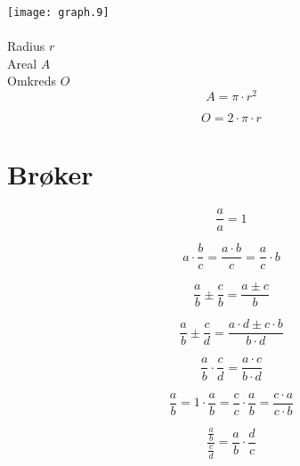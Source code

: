 \documentclass[11pt,a5paper,fleqn,leqno]{book}
\begin{document}
\texttt{[image: graph.9]}
\\
\\
Radius $r$ \\
Areal $A$ \\
Omkreds $O$
\begin{equation}
A = \pi \cdot r^2
\end{equation}

\begin{equation}
O = 2 \cdot \pi \cdot r
\end{equation}

\section{Brøker}

\begin{equation} \label{eq:taeller_naevner_det_samme}
\frac{a}{a} = 1
\end{equation}

\begin{equation} \label{eq:konstant_gange_med_broek}
a \cdot \frac{b}{c} = \frac{a \cdot b}{c} = \frac{a}{c} \cdot b
\end{equation}

\begin{equation} \label{eq:broeker_med_ens_naevnere_plusminus}
\frac{a}{b} \pm \frac{c}{b} = \frac{a \pm c}{b}
\end{equation}

\begin{equation} \label{eq:broeker_med_forskellige_naevnere_plusminus}
\frac{a}{b} \pm \frac{c}{d} = \frac{a \cdot d \pm c \cdot b}{b \cdot d}
\end{equation}

\begin{equation} \label{eq:broeker_ganget_sammen}
\frac{a}{b} \cdot \frac{c}{d} = \frac{a \cdot c}{b \cdot d}
\end{equation}

\begin{equation} \label{eq:forlaenge_en_broek}
\frac{a}{b} = 1 \cdot \frac{a}{b} = \frac{c}{c} \cdot \frac{a}{b} = \frac{c \cdot a}{c \cdot b}
\end{equation}

\begin{equation} \label{eq:broeker_divideret}
\frac{\frac{a}{b}}{\frac{c}{d}} = \frac{a}{b} \cdot \frac{d}{c}
\end{equation}

\newpage
\end{document}

